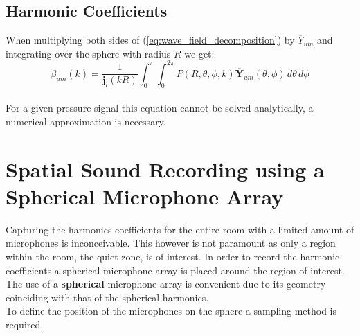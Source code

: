 \subsection{Harmonic Coefficients}
When multiplying both sides of (\ref{eq:wave_field_decomposition}) by $\overline Y_{um}$ and integrating over the sphere with radius $R$ we get\cite{Chen2017}:\\
\begin{equation}
    {\beta_{um}(k) = \frac{1}{\mathbf j_l(kR)}\int_0^\pi\int_0^{2\pi}P(R,\theta,\phi,k) \overline {\mathbf{Y}}_{um}(\theta,\phi)\,d\theta\, d\phi}
    \label{eq:harmonic_coefficients}
\end{equation}\\
For a given pressure signal this equation cannot be solved analytically, a numerical approximation is necessary.
\section{Spatial Sound Recording using a Spherical Microphone Array}\label{sec:sampling}
Capturing the harmonics coefficients for the entire room with a limited amount of microphones is inconceivable. This however is not paramount as only a region within the room, the quiet zone, is of interest. In order to record the harmonic coefficients a spherical microphone array is placed around the region of interest. The use of a \textbf{spherical} microphone array is convenient due to its geometry coinciding with that of the spherical harmonics\cite{Chen2017}.\\
To define the position of the microphones on the sphere a sampling method is required.
